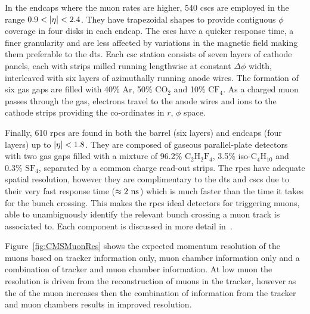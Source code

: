 In the endcaps where the muon rates are higher, 540 \acrshort{csc}s are employed in the range $0.9<\lvert \eta \rvert<2.4$. 
They have trapezoidal shapes to provide contiguous $\phi$ coverage in four disks in each endcap.
The \acrshort{csc}s have a quicker response time, a finer granularity and are less affected by variations in the magnetic field making them preferable to the \acrshort{dt}s.
Each \acrshort{csc} station consists of seven layers of cathode panels, each with strips milled running lengthwise at constant $\Delta\phi$ width, interleaved with six layers of azimuthally running anode wires.
The formation of six gas gaps are filled with 40\% $\mathrm{Ar}$, 50\% $\mathrm{CO}_{2}$ and 10\% $\mathrm{CF}_{4}$.
As a charged muon passes through the gas, electrons travel to the anode wires and ions to the cathode strips providing the co-ordinates in $r,\,\phi$ space.

Finally, 610 \acrshort{rpc}s are found in both the barrel (six layers) and endcaps (four layers) up to $\lvert \eta \rvert<1.8$.
They are composed of gaseous parallel-plate detectors with two gas gaps filled with a mixture of 96.2\% $\mathrm{C}_{2}\mathrm{H}_{2}\mathrm{F}_{4}$, 3.5\% iso-$\mathrm{C}_{4}\mathrm{H}_{10}$ and 0.3\% $\mathrm{SF}_{4}$, separated by a common charge read-out strips.
The \acrshort{rpc}s have adequate spatial resolution, however they are complimentary to the \acrshort{dt}s and \acrshort{csc}s due to their very fast response time ($\approx2\mathrm{~ns}^{}$) which is much faster than the time it takes for the bunch crossing.
This makes the \acrshort{rpc}s ideal detectors for triggering muons, able to unambiguously identify the relevant bunch crossing a muon track is associated to.
Each component is discussed in more detail in~\cite{CMSExperiment,CMSMuon}.

Figure~\ref{fig:CMSMuonRes} shows the expected momentum resolution of the muons based on tracker information only, muon chamber information only and a combination of tracker and muon chamber information.
At low muon \pt{} the resolution is driven from the reconstruction of muons in the tracker, however as the \pt{} of the muon increases then the combination of information from the tracker and muon chambers results in improved resolution.

